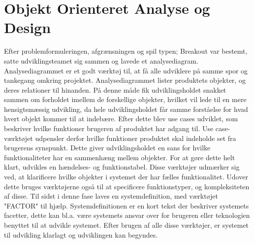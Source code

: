 \section{Objekt Orienteret Analyse og Design}
Efter problemformuleringen, afgrænsningen  og spil typen; Breakout var bestemt, satte udviklingsteamet sig sammen og lavede et analysediagram. Analysediagrammet er et godt værktøj til, at få alle udviklere på samme spor og tankegang omkring projektet. Analysediagrammet lister produktets objekter, og deres relationer til hinanden. På denne måde fik udviklingsholdet snakket sammen om forholdet imellem de forskellige objekter, hvilket vil lede til en mere hensigtsmæssig udvikling, da hele udviklingsholdet får samme forståelse for hvad hvert objekt kommer til at indebære. Efter dette blev use cases udviklet, som beskriver hvilke funktioner brugeren af produktet har adgang til. Use case-værktøjet udpensler derfor hvilke funktioner produktet skal indeholde set fra brugerens synspunkt. Dette giver udviklingsholdet en sans for hvilke funktionaliteter har en sammenhæng mellem objekter. For at gøre dette helt klart, udvikles en hændelses- og funktionstabel. Disse værktøjer udmærker sig ved, at klarificere hvilke objekter i systemet der har fælles funktionalitet. Udover dette bruges værktøjerne også til at specificere funktionstyper, og kompleksiteten af disse. Til sidst i denne fase laves en systemdefinition, med værktøjet "FACTOR" til hjælp. Systemdefinitionen er en kort tekst der beskriver systemets facetter, dette kan bl.a. være systemets ansvar over for brugeren eller teknologien benyttet til at udvikle systemet. Efter brugen af alle disse værktøjer, er systemet til udvikling klarlagt og udviklingen kan begyndes.